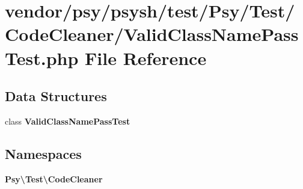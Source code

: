 \section{vendor/psy/psysh/test/\+Psy/\+Test/\+Code\+Cleaner/\+Valid\+Class\+Name\+Pass\+Test.php File Reference}
\label{_valid_class_name_pass_test_8php}
\subsection*{Data Structures}
\begin{DoxyCompactItemize}
\item 
class {\bf Valid\+Class\+Name\+Pass\+Test}
\end{DoxyCompactItemize}
\subsection*{Namespaces}
\begin{DoxyCompactItemize}
\item 
 {\bf Psy\textbackslash{}\+Test\textbackslash{}\+Code\+Cleaner}
\end{DoxyCompactItemize}
